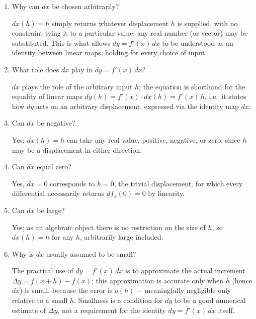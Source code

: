 \documentclass{self-check}
\begin{document}
\begin{enumerate}[resume, leftmargin=*, itemsep=8pt]
\item Why can \(dx\) be chosen arbitrarily?
\begin{answer}
\(dx(h)=h\) simply returns whatever displacement \(h\) is supplied, with no constraint tying it to a particular value; any real number (or vector) may be substituted. This is what allows \(dy=f'(x)\,dx\) to be understood as an identity between linear maps, holding for every choice of input.
\end{answer}

\item What role does \(dx\) play in \(dy=f'(x)\,dx\)?
\begin{answer}
\(dx\) plays the role of the arbitrary input \(h\); the equation is shorthand for the equality of linear maps \(dy(h)=f'(x)\cdot dx(h)=f'(x)\,h\), i.e.\ it states how \(dy\) acts on an arbitrary displacement, expressed via the identity map \(dx\).
\end{answer}

\item Can \(dx\) be negative?
\begin{answer}
Yes; \(dx(h)=h\) can take any real value, positive, negative, or zero, since \(h\) may be a displacement in either direction.
\end{answer}

\item Can \(dx\) equal zero?
\begin{answer}
Yes, \(dx=0\) corresponds to \(h=0\), the trivial displacement, for which every differential necessarily returns \(df_x(0)=0\) by linearity.
\end{answer}

\item Can \(dx\) be large?
\begin{answer}
Yes; as an algebraic object there is no restriction on the size of \(h\), so \(dx(h)=h\) for any \(h\), arbitrarily large included.
\end{answer}

\item Why is \(dx\) usually assumed to be small?
\begin{answer}
The practical use of \(dy=f'(x)\,dx\) is to approximate the actual increment \(\Delta y=f(x+h)-f(x)\); this approximation is accurate only when \(h\) (hence \(dx\)) is small, because the error is \(o(h)\) \(-\) meaningfully negligible only relative to a small \(h\). Smallness is a condition for \(dy\) to be a good numerical estimate of \(\Delta y\), not a requirement for the identity \(dy=f'(x)\,dx\) itself.
\end{answer}


\end{enumerate}
\end{document}
